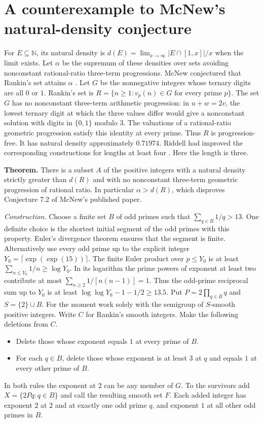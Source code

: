 \section{A counterexample to McNew's natural-density conjecture}\label{sec:rankin}
For $E\subseteq\mathbb N$, its natural density is $d(E)=\lim_{x\to\infty}|E\cap[1,x]|/x$ when the limit exists. Let $\alpha$ be the supremum of these densities over sets avoiding nonconstant rational-ratio three-term progressions. McNew conjectured that Rankin's set attains $\alpha$ \cite[Conj.~7.2]{mcnew}. Let $G$ be the nonnegative integers whose ternary digits are all $0$ or
$1$. Rankin's set is $R=\{n\ge1:v_p(n)\in G\text{ for every prime }p\}$.
The set $G$ has no nonconstant three-term arithmetic progression:
in $u+w=2v$, the lowest ternary digit at which the three values differ
would give a nonconstant solution with digits in $\{0,1\}$ modulo $3$.
The valuations of a rational-ratio geometric progression satisfy this
identity at every prime. Thus $R$ is progression-free.
It has natural density approximately $0.71974$. Riddell had improved the corresponding constructions for lengths at least four \cite{riddell}. Here the length is three.

\medskip\noindent\textbf{Theorem.}
There is a subset $A$ of the positive integers with a natural density
strictly greater than $d(R)$ and with no nonconstant three-term
geometric progression of rational ratio. In particular
$\alpha>d(R)$, which disproves Conjecture 7.2 of McNew's published paper.

\medskip\noindent\textit{Construction.}
Choose a finite set $B$ of odd primes such that
$\sum_{q\in B}1/q>13$. One definite choice is the shortest initial
segment of the odd primes with this property. Euler's divergence theorem
ensures that the segment is finite. Alternatively use every odd prime up
to the explicit integer $Y_0=\lceil\exp(\exp(15))\rceil$. The finite Euler
product over $p\le Y_0$ is at least $\sum_{n\le Y_0}1/n\ge\log Y_0$. In its
logarithm the prime powers of exponent at least two contribute at most
$\sum_{n\ge2}1/[n(n-1)]=1$. Thus the odd-prime reciprocal sum up to
$Y_0$ is at least $\log\log Y_0-1-1/2\ge13.5$. Put $P=2\prod_{q\in B}q$ and
$S=\{2\}\cup B$. For the moment work solely with the semigroup of
$S$-smooth positive integers. Write $C$ for Rankin's smooth integers.
Make the following deletions from $C$.
\begin{itemize}
\item Delete those whose exponent equals $1$ at every prime of $B$.
\item For each $q\in B$, delete those whose exponent is at least $3$ at
$q$ and equals $1$ at every other prime of $B$.
\end{itemize}
In both rules the exponent at $2$ can be any member of $G$.
To the survivors add $X=\{2Pq:q\in B\}$ and call the resulting smooth
set $F$. Each added integer has exponent $2$ at $2$ and at exactly one
odd prime $q$, and exponent $1$ at all other odd primes in $B$.

